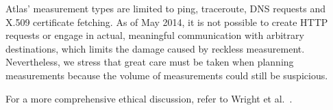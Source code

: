 Atlas' measurement types are limited to ping, traceroute, DNS requests and
X.509 certificate fetching.  As of May 2014, it is not possible to create HTTP
requests or engage in actual, meaningful communication with arbitrary
destinations, which limits the damage caused by reckless measurement.
Nevertheless, we stress that great care must be taken when planning
measurements because the volume of measurements could still be suspicious.

For a more comprehensive ethical discussion, refer to Wright et
al.~\cite[\S~5]{Wright2011}.
